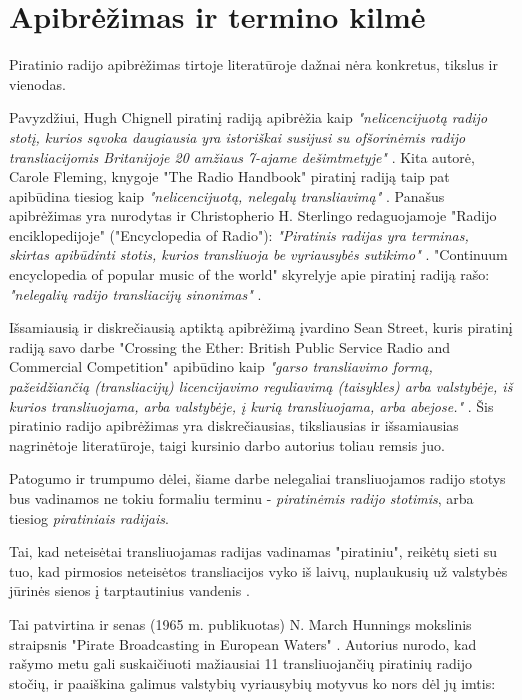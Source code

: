 \documentclass[kursinis-darbas]{vukf}
\begin{document}
\section{Apibrėžimas ir termino kilmė}

Piratinio radijo apibrėžimas tirtoje literatūroje dažnai nėra konkretus, tikslus ir vienodas.

Pavyzdžiui, Hugh Chignell piratinį radiją apibrėžia kaip \emph{"nelicencijuotą radijo stotį, kurios sąvoka daugiausia yra istoriškai susijusi su ofšorinėmis radijo transliacijomis Britanijoje 20 amžiaus 7-ajame dešimtmetyje"} \cite[p.~137]{hc_key_concepts_in_radio_studies}. Kita autorė, Carole Fleming, knygoje "The Radio Handbook" piratinį radiją taip pat apibūdina tiesiog kaip \emph{"nelicencijuotą, nelegalų transliavimą"} \cite[p.~35]{cf_the_radio_handbook}. Panašus apibrėžimas yra nurodytas ir Christopherio H. Sterlingo redaguojamoje "Radijo enciklopedijoje" ("Encyclopedia of Radio"): \emph{"Piratinis radijas yra terminas, skirtas apibūdinti stotis, kurios transliuoja be vyriausybės sutikimo"} \cite[p.~237]{chs_encyclopedia_of_radio}. "Continuum encyclopedia of popular music of the world" skyrelyje apie piratinį radiją rašo: \emph{"nelegalių radijo transliacijų sinonimas"} \cite[p.~447]{js_continuum_encyclopedia}.

Išsamiausią ir diskrečiausią aptiktą apibrėžimą įvardino Sean Street, kuris piratinį radiją savo darbe "Crossing the Ether: British Public Service Radio and Commercial Competition" apibūdino kaip \emph{"garso transliavimo formą, pažeidžiančią (transliacijų) licencijavimo reguliavimą (taisykles) arba valstybėje, iš kurios transliuojama, arba valstybėje, į kurią transliuojama, arba abejose."} \cite[p.206]{ss_crossing_the_ether_british_public_service_radio_and_commercial_competition}. Šis piratinio radijo apibrėžimas yra diskrečiausias, tiksliausias ir išsamiausias nagrinėtoje literatūroje, taigi kursinio darbo autorius toliau remsis juo.

Patogumo ir trumpumo dėlei, šiame darbe nelegaliai transliuojamos radijo stotys bus vadinamos ne tokiu formaliu terminu - \emph{piratinėmis radijo stotimis}, arba tiesiog \emph{piratiniais radijais}.

Tai, kad neteisėtai transliuojamas radijas vadinamas "piratiniu", reikėtų sieti su tuo, kad pirmosios neteisėtos transliacijos vyko iš laivų, nuplaukusių už valstybės jūrinės sienos į tarptautinius vandenis \cite[p.~447]{js_continuum_encyclopedia}.

Tai patvirtina ir senas (1965 m. publikuotas) N. March Hunnings mokslinis straipsnis "Pirate Broadcasting in European Waters" \cite[p.~412]{nmh_pirate_broadcasting_in_european_waters_1965}. Autorius nurodo, kad rašymo metu gali suskaičiuoti mažiausiai 11 transliuojančių piratinių radijo stočių, ir paaiškina galimus valstybių vyriausybių motyvus ko nors dėl jų imtis:
\end{document}
